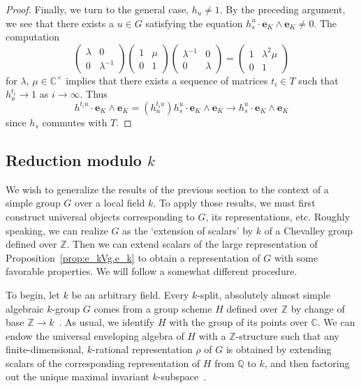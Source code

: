 \documentclass{amsart}
\theoremstyle{plain}
\theoremstyle{definition}
\theoremstyle{remark}
\newcommand{\Vect}[1]{\mathbold{#1}}
\begin{document}
\begin{proof}
Finally, we turn to the general case, $h_{u} \neq 1$. By the preceding argument, we see
that there exists a $u \in G$ satisfying the equation $h_{s}^{u} \cdot
\Vect{e}_{K} \wedge \Vect{e}_{K} \neq 0$. The computation
$$\left(\begin{array}{cc}
\lambda & 0\\
0 & \lambda^{-1}
\end{array}\right)
\left(\begin{array}{cc}
1 & \mu\\
0 & 1
\end{array}\right)
\left(\begin{array}{cc}
\lambda^{-1} & 0\\
0 & \lambda
\end{array}\right)
= \left(\begin{array}{cc}
1 & \lambda^{2}\mu\\
0 & 1
\end{array}\right)$$
for $\lambda$, $\mu \in \mathbb{C}^{\times}$
implies that there exists a sequence of matrices $t_{i} \in T$ such that $h_{u}^{t_{i}}
\to 1$ as $i \to \infty$. Thus
$$
h^{t_{i}u} \cdot \Vect{e}_{K} \wedge \Vect{e}_{K} = (h_{u}^{t_{i}u})h_{s}^{u} \cdot
\Vect{e}_{K} \wedge \Vect{e}_{K} 
\to h_{s}^{u} \cdot
\Vect{e}_{K} \wedge \Vect{e}_{K}
$$
since $h_{s}$ commutes with $T$.
\end{proof}
\subsection{Reduction modulo $k$}\label{sec:ReductionModk}
We wish to generalize the results of the previous section to the context of a simple
group $G$ over a local field $k$. To apply those results, we must first construct
universal objects corresponding to $G$, its representations, etc. Roughly speaking, we
can realize $G$ as the `extension of scalars' by $k$ of a Chevalley group defined over
$\mathbb{Z}$. Then we can extend scalars of the large representation of
Proposition~\ref{prop:e_kVg.e_k} to obtain a representation of $G$ with some favorable
properties. We will follow a somewhat different procedure.

To begin, let $k$ be an arbitrary field.
Every $k$-split, absolutely almost simple algebraic $k$-group $G$ comes from a group scheme
$H$ defined over
$\mathbb{Z}$ by change of base $\mathbb{Z} \to k$~\cite{MR1611814}. As usual, we identify $H$ with the
group of its points over $\mathbb{C}$. We can endow the
universal enveloping algebra
of $H$ with a $\mathbb{Z}$-structure such that any finite-dimensional, $k$-rational
representation $\rho$ of $G$ is obtained by extending scalars of the
corresponding representation of $H$ from $\mathbb{Q}$ to $k$, and then factoring out the
unique maximal invariant $k$-subspace~\cite{MR0207713}.
\end{document}
